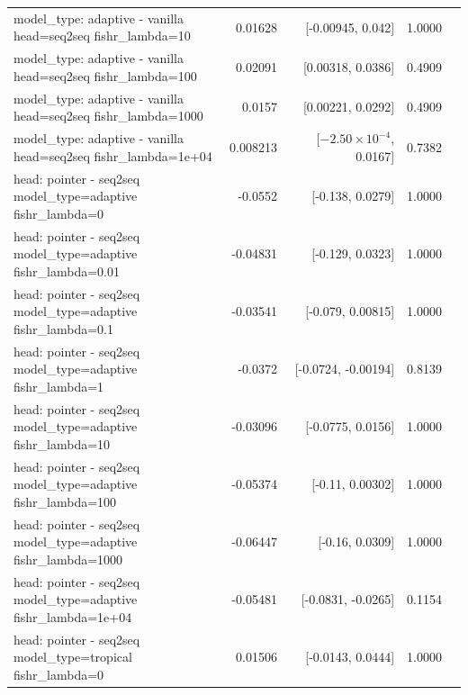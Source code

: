 \documentclass[10pt]{article}
\makeatletter
\newcommand{\stackcell}[1]{\begin{tabular}[t]{@{}l@{}}#1\end{tabular}}
\makeatother
\begin{document}
{\begin{longtable}{lrrrl}
\stackcell{model\_type: adaptive - vanilla\\\footnotesize head=seq2seq fishr\_lambda=10 } & 0.01628 & [-0.00945, 0.042] & 1.0000 & \\
\stackcell{model\_type: adaptive - vanilla\\\footnotesize head=seq2seq fishr\_lambda=100 } & 0.02091 & [0.00318, 0.0386] & 0.4909 & \\
\stackcell{model\_type: adaptive - vanilla\\\footnotesize head=seq2seq fishr\_lambda=1000 } & 0.0157 & [0.00221, 0.0292] & 0.4909 & \\
\stackcell{model\_type: adaptive - vanilla\\\footnotesize head=seq2seq fishr\_lambda=1e+04 } & 0.008213 & [$-2.50\times10^{-4}$, 0.0167] & 0.7382 & \\
\stackcell{head: pointer - seq2seq\\\footnotesize model\_type=adaptive fishr\_lambda=0 } & -0.0552 & [-0.138, 0.0279] & 1.0000 & \\
\stackcell{head: pointer - seq2seq\\\footnotesize model\_type=adaptive fishr\_lambda=0.01 } & -0.04831 & [-0.129, 0.0323] & 1.0000 & \\
\stackcell{head: pointer - seq2seq\\\footnotesize model\_type=adaptive fishr\_lambda=0.1 } & -0.03541 & [-0.079, 0.00815] & 1.0000 & \\
\stackcell{head: pointer - seq2seq\\\footnotesize model\_type=adaptive fishr\_lambda=1 } & -0.0372 & [-0.0724, -0.00194] & 0.8139 & \\
\stackcell{head: pointer - seq2seq\\\footnotesize model\_type=adaptive fishr\_lambda=10 } & -0.03096 & [-0.0775, 0.0156] & 1.0000 & \\
\stackcell{head: pointer - seq2seq\\\footnotesize model\_type=adaptive fishr\_lambda=100 } & -0.05374 & [-0.11, 0.00302] & 1.0000 & \\
\stackcell{head: pointer - seq2seq\\\footnotesize model\_type=adaptive fishr\_lambda=1000 } & -0.06447 & [-0.16, 0.0309] & 1.0000 & \\
\stackcell{head: pointer - seq2seq\\\footnotesize model\_type=adaptive fishr\_lambda=1e+04 } & -0.05481 & [-0.0831, -0.0265] & 0.1154 & \\
\stackcell{head: pointer - seq2seq\\\footnotesize model\_type=tropical fishr\_lambda=0 } & 0.01506 & [-0.0143, 0.0444] & 1.0000 & \\

\end{longtable}}
\end{document}
